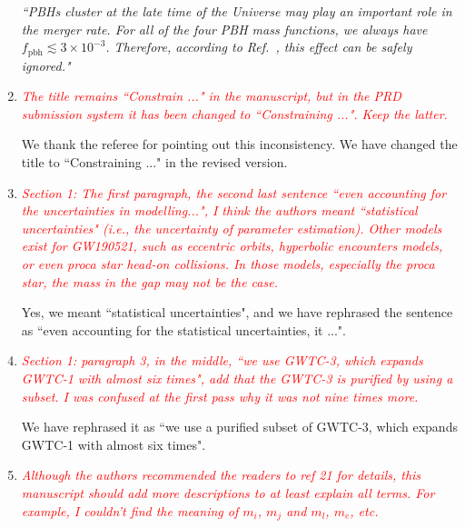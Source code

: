 \documentclass[
preprint,          %
superscriptaddress,%
amsmath,           %
amssymb,           %
aps,               %
prl,               %
notitlepage,       %
longbibliography,  %
floatfix,          %
nofootinbib,
onecolumn,
]{revtex4-1}
\newcommand{\red}[1]{\textcolor{red}{#1}}
\begin{document}
\begin{enumerate}
\textit{``PBHs cluster at the late time of the Universe may play an important role in the merger rate. For all of the four PBH mass functions, we always have $f_{\mathrm{pbh}} \lesssim 3\times10^{-3}$. Therefore, according to Ref.~\cite{Hutsi:2020sol}, this effect can be safely ignored."}




\item \red{\it The title remains ``Constrain ..." in the manuscript, but in the PRD submission system it has been changed to ``Constraining ...". Keep the latter.}

We thank the referee for pointing out this inconsistency. We have changed the title to ``Constraining ..." in the revised version.


\item \red{\it Section 1: The first paragraph, the second last sentence ``even accounting for the uncertainties in modelling...", I think the authors meant ``statistical uncertainties" (i.e., the uncertainty of parameter estimation). Other models exist for GW190521, such as eccentric orbits, hyperbolic encounters models, or even proca star head-on collisions. In those models, especially the proca star, the mass in the gap may not be the case.}

Yes, we meant ``statistical uncertainties", and we have rephrased the sentence as ``even accounting for the statistical uncertainties, it ...".

\item \red{\it Section 1: paragraph 3, in the middle, ``we use GWTC-3, which expands GWTC-1 with almost six times", add that the GWTC-3 is purified by using a subset. I was confused at the first pass why it was not nine times more.}

We have rephrased it as ``we use a purified subset of GWTC-3, which expands GWTC-1 with almost six times".

\item \red{\it Although the authors recommended the readers to ref 21 for details, this manuscript should add more descriptions to at least explain all terms. For example, I couldn't find the meaning of $m_i$, $m_j$ and $m_l$, $m_e$, etc.}


\end{enumerate}
\end{document}

